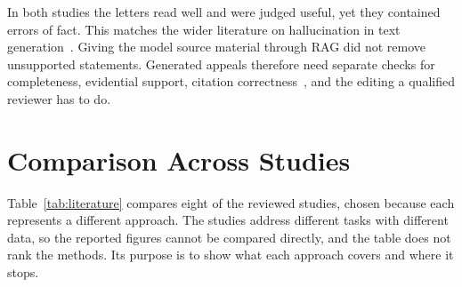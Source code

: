 \documentclass[conference]{IEEEtran}
\begin{document}
In both studies the letters read well and were judged useful, yet they contained errors of fact. This matches the wider literature on hallucination in text generation~\cite{ji2023}. Giving the model source material through RAG did not remove unsupported statements. Generated appeals therefore need separate checks for completeness, evidential support, citation correctness~\cite{gao2023}, and the editing a qualified reviewer has to do.

\section{Comparison Across Studies}
\label{sec:comparison}
Table~\ref{tab:literature} compares eight of the reviewed studies, chosen because each represents a different approach. The studies address different tasks with different data, so the reported figures cannot be compared directly, and the table does not rank the methods. Its purpose is to show what each approach covers and where it stops.
\end{document}
